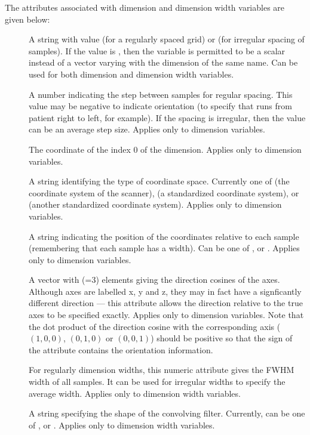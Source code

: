 The attributes associated with dimension and dimension width variables
are given below:
\begin{description}
   \item [] A string with value  (for
      a regularly spaced grid) or  (for irregular
      spacing of samples). If the value is , then the
      variable is permitted to be a scalar instead of a vector varying
      with the dimension of the same name. Can be used for both
      dimension and dimension width variables.
   \item [] A number indicating the step between samples
      for regular spacing. This value may be negative to indicate
      orientation (to specify that  runs from patient
      right to left, for example). If the spacing is irregular, then
      the value can be an average step size. Applies only to dimension
      variables. 
   \item [] The coordinate of the index 0 of the dimension.
      Applies only to dimension variables.
   \item [] A string identifying the type of
      coordinate space. Currently one of  (the
      coordinate system of the scanner),  (a
      standardized coordinate system), or  (another
      standardized coordinate system). Applies only to dimension variables.
   \item [] A string indicating the position of the
      coordinates relative to each sample (remembering that each sample
      has a width). Can be one of ,  or
      . Applies only to dimension variables.
   \item [] A vector with
      (=3) elements giving the
      direction cosines of the axes. Although axes are labelled x, y
      and z, they may in fact have a signficantly different
      direction --- this attribute allows the direction relative to
      the true axes to be specified exactly. Applies only to dimension
      variables. Note that the dot product of the direction cosine
      with the corresponding axis ($(1,0,0)$, $(0,1,0)$ or $(0,0,1)$)
      should be positive so that the sign of the attribute
       contains the orientation information.
   \item [] For regularly dimension widths, this
      numeric attribute gives the FWHM width of all samples. It can be used
      for irregular widths to specify the average width. Applies only
      to dimension width variables.
   \item [] A string specifying the shape of the
      convolving filter. Currently, can be one of ,
       or . Applies only to
      dimension width variables.
\end{description}

